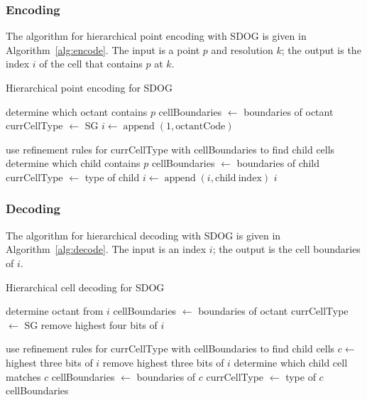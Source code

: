 \subsubsection{Encoding}
The algorithm for hierarchical point encoding with SDOG is given in Algorithm~\ref{alg:encode}.
The input is a point $p$ and resolution $k$; the output is the index $i$ of the cell that contains $p$ at $k$.


\begin{algorithm}
	\caption{Hierarchical point encoding for SDOG}
	
	\begin{algorithmic}
		
		\STATE determine which octant contains $p$
		\STATE cellBoundaries $\leftarrow$ boundaries of octant
		\STATE currCellType $\leftarrow$ SG
		\STATE $i \leftarrow \operatorname{append}(1, \mathrm{octantCode})$
		
		\STATE use refinement rules for currCellType with cellBoundaries to find child cells
		\STATE determine which child contains $p$
		\STATE cellBoundaries $\leftarrow$ boundaries of child
		\STATE currCellType $\leftarrow$ type of child
		\STATE $i \leftarrow \operatorname{append}(i, \mathrm{child~index})$
		\ENDFOR
		\RETURN $i$
		
	\end{algorithmic}
	\label{alg:encode}
\end{algorithm}


\subsubsection{Decoding}
The algorithm for hierarchical decoding with SDOG is given in Algorithm~\ref{alg:decode}.
The input is an index $i$; the output is the cell boundaries of $i$.


\begin{algorithm}
	\caption{Hierarchical cell decoding for SDOG}
	
	\begin{algorithmic}
		
		\STATE determine octant from $i$
		\STATE cellBoundaries $\leftarrow$ boundaries of octant
		\STATE currCellType $\leftarrow$ SG
		\STATE remove highest four bits of $i$
		
		\FOR{$k$ iterations}
		\STATE use refinement rules for currCellType with cellBoundaries to find child cells
		\STATE $c \leftarrow$ highest three bits of $i$
		\STATE remove highest three bits of $i$
		\STATE determine which child cell matches $c$
		\STATE cellBoundaries $\leftarrow$ boundaries of $c$
		\STATE currCellType $\leftarrow$ type of $c$
		\ENDFOR
		\RETURN cellBoundaries
		
	\end{algorithmic}
	\label{alg:decode}
\end{algorithm}


